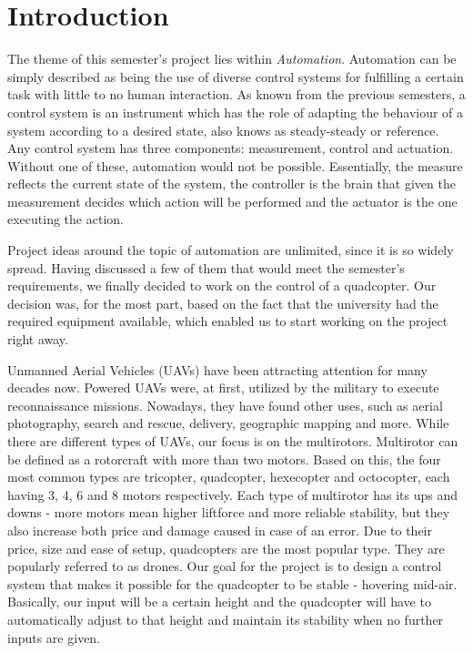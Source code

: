 \section{Introduction}

The theme of this semester's project lies within \textit{Automation}. Automation can be simply described as being the use of diverse control systems for fulfilling a certain task with little to no human interaction. As known from the previous semesters, a control system is an instrument which has the role of adapting the behaviour of a system according to a desired state, also knows as steady-steady or reference. Any control system has three components: measurement, control and actuation. Without one of these, automation would not be possible. Essentially, the measure reflects the current state of the system, the controller is the brain that given the measurement decides which action will be performed and the actuator is the one executing the action. 

Project ideas around the topic of automation are unlimited, since it is so widely spread. Having discussed a few of them that would meet the semester's requirements, we finally decided to work on the control of a quadcopter. Our decision was, for the most part, based on the fact that the university had the required equipment available, which enabled us to start working on the project right away. 

Unmanned Aerial Vehicles (UAVs) have been attracting attention for many decades now. Powered UAVs were, at first, utilized by the military to execute reconnaissance missions. Nowadays, they have found other uses, such as aerial photography, search and rescue, delivery, geographic mapping and more. While there are different types of UAVs, our focus is on the multirotors. Multirotor can be defined as a rotorcraft with more than two motors. Based on this, the four most common types are tricopter, quadcopter, hexecopter and octocopter, each having 3, 4, 6 and 8 motors respectively. Each type of multirotor has its ups and downs - more motors mean higher liftforce and more reliable stability, but they also increase both price and damage caused in case of an error. Due to their price, size and ease of setup, quadcopters are the most popular type. They are popularly referred to as drones. Our goal for the project is to design a control system that makes it possible for the quadcopter to be stable - hovering mid-air. Basically, our input will be a certain height and the quadcopter will have to automatically adjust to that height and maintain its stability when no further inputs are given. 
